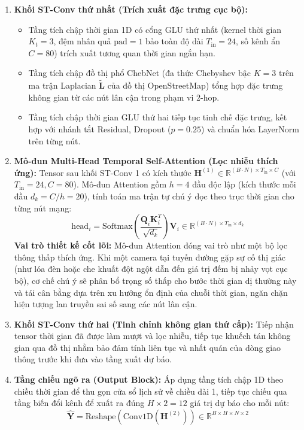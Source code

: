 \begin{enumerate}
    \item \textbf{Khối ST-Conv thứ nhất (Trích xuất đặc trưng cục bộ):}
    \begin{itemize}
        \item Tầng tích chập thời gian 1D có cổng GLU thứ nhất (kernel thời gian $K_t = 3$, đệm nhân quả $\text{pad}=1$ bảo toàn độ dài $T_{\text{in}}=24$, số kênh ẩn $C = 80$) trích xuất tương quan thời gian ngắn hạn.
        \item Tầng tích chập đồ thị phổ ChebNet (đa thức Chebyshev bậc $K = 3$ trên ma trận Laplacian $\tilde{\mathbf{L}}$ của đồ thị OpenStreetMap) tổng hợp đặc trưng không gian từ các nút lân cận trong phạm vi 2-hop.
        \item Tầng tích chập thời gian GLU thứ hai tiếp tục tinh chế đặc trưng, kết hợp với nhánh tắt Residual, Dropout ($p=0.25$) và chuẩn hóa LayerNorm trên từng nút.
    \end{itemize}

    \item \textbf{Mô-đun Multi-Head Temporal Self-Attention (Lọc nhiễu thích ứng):}
    Tensor sau khối ST-Conv 1 có kích thước $\mathbf{H}^{(1)} \in \mathbb{R}^{(B \cdot N) \times T_{\text{in}} \times C}$ (với $T_{\text{in}}=24, C=80$). Mô-đun Attention gồm $h = 4$ đầu độc lập (kích thước mỗi đầu $d_k = C/h = 20$), tính toán ma trận tự chú ý dọc theo trục thời gian cho từng nút mạng:
    \begin{equation}
        \text{head}_i = \text{Softmax}\left(\frac{\mathbf{Q}_i \mathbf{K}_i^T}{\sqrt{d_k}}\right) \mathbf{V}_i \in \mathbb{R}^{(B \cdot N) \times T_{\text{in}} \times d_k}
    \end{equation}
    \textbf{Vai trò thiết kế cốt lõi:} Mô-đun Attention đóng vai trò như một bộ lọc thông thấp thích ứng. Khi một camera tại tuyến đường gặp sự cố thị giác (như lóa đèn hoặc che khuất đột ngột dẫn đến giá trị đếm bị nhảy vọt cục bộ), cơ chế chú ý sẽ phân bổ trọng số thấp cho bước thời gian dị thường này và tái cân bằng dựa trên xu hướng ổn định của chuỗi thời gian, ngăn chặn hiện tượng lan truyền sai số sang các nút lân cận.

    \item \textbf{Khối ST-Conv thứ hai (Tinh chỉnh không gian thứ cấp):}
    Tiếp nhận tensor thời gian đã được làm mượt và lọc nhiễu, tiếp tục khuếch tán không gian qua đồ thị nhằm bảo đảm tính liên tục và nhất quán của dòng giao thông trước khi đưa vào tầng xuất dự báo.

    \item \textbf{Tầng chiếu ngõ ra (Output Block):}
    Áp dụng tầng tích chập 1D theo chiều thời gian để thu gọn cửa sổ lịch sử về chiều dài 1, tiếp tục chiếu qua tầng biến đổi kênh để xuất ra đúng $H \times 2 = 12$ giá trị dự báo cho mỗi nút:
    \begin{equation}
        \hat{\mathbf{Y}} = \text{Reshape}\left( \text{Conv1D}\left(\mathbf{H}^{(2)}\right) \right) \in \mathbb{R}^{B \times H \times N \times 2}
    \end{equation}
\end{enumerate}

